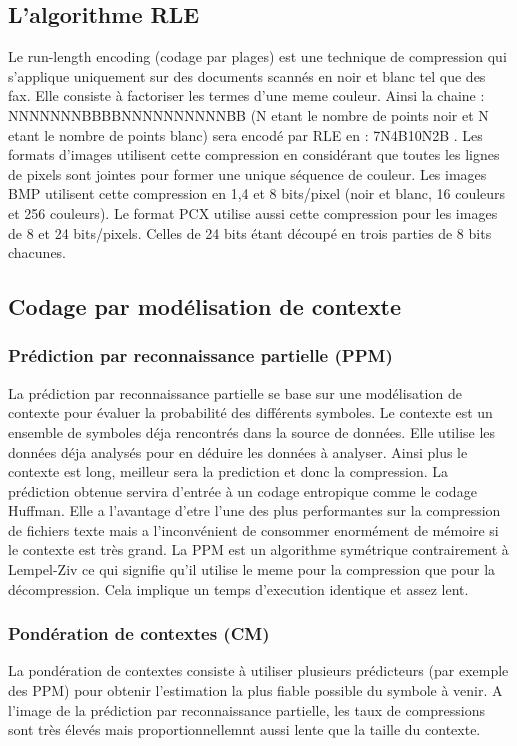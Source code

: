 \documentclass[a4paper]{report}
\begin{document}
	\subsection{L'algorithme RLE}
		Le run-length encoding (codage par plages) est une technique de compression qui s'applique uniquement sur des documents scannés en noir et blanc tel que des fax. Elle consiste à factoriser les termes d'une meme couleur. Ainsi la chaine : NNNNNNNBBBBNNNNNNNNNNBB (N etant le nombre de points noir et N etant le nombre de points blanc) sera encodé par RLE en : 7N4B10N2B . Les formats d'images utilisent cette compression en considérant que toutes les lignes de pixels sont jointes pour former une unique séquence de couleur. Les images BMP utilisent cette compression en 1,4 et 8 bits/pixel (noir et blanc, 16 couleurs et 256 couleurs). Le format PCX utilise aussi cette compression pour les images de 8 et 24 bits/pixels. Celles de 24 bits étant découpé en trois parties de 8 bits chacunes.
	\subsection{Codage par modélisation de contexte}
	\subsubsection{Prédiction par reconnaissance partielle (PPM)}
		La prédiction par reconnaissance partielle se base sur une modélisation de contexte pour évaluer la probabilité des différents symboles. Le contexte est un ensemble de symboles déja rencontrés dans la source de données. Elle utilise les données déja analysés pour en déduire les données à analyser. Ainsi plus le contexte est long, meilleur sera la prediction et donc la compression. La prédiction obtenue servira d'entrée à un codage entropique comme le codage Huffman. Elle a l'avantage d'etre l'une des plus performantes sur la compression de fichiers texte mais a l'inconvénient de consommer enormément de mémoire si le contexte est très grand. La PPM est un algorithme symétrique contrairement à Lempel-Ziv ce qui signifie qu'il utilise le meme pour la compression que pour la décompression. Cela implique un temps d'execution identique et assez lent.
	\subsubsection{Pondération de contextes (CM)}
		La pondération de contextes consiste à utiliser plusieurs prédicteurs (par exemple des PPM) pour obtenir l'estimation la plus fiable possible du symbole à venir. A l'image de la prédiction par reconnaissance partielle, les taux de compressions sont très élevés mais proportionnellemnt aussi lente que la taille du contexte.
\end{document}
